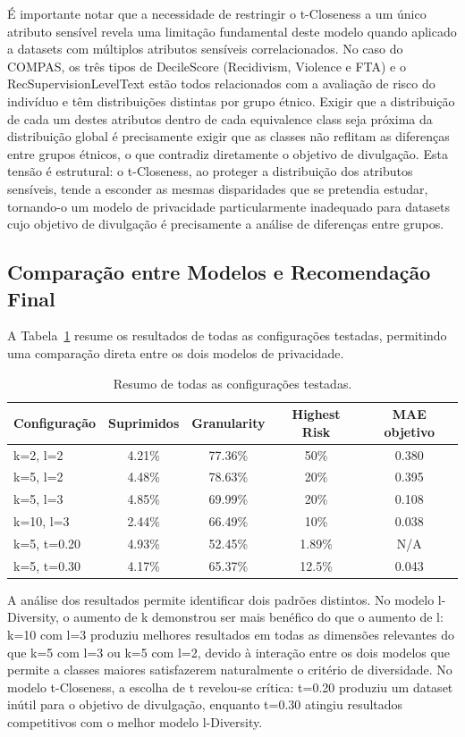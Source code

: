 É importante notar que a necessidade de restringir o t-Closeness a um único atributo sensível revela uma limitação fundamental deste modelo quando aplicado a datasets com múltiplos atributos sensíveis correlacionados. No caso do COMPAS, os três tipos de DecileScore (Recidivism, Violence e FTA) e o RecSupervisionLevelText estão todos relacionados com a avaliação de risco do indivíduo e têm distribuições distintas por grupo étnico. Exigir que a distribuição de cada um destes atributos dentro de cada equivalence class seja próxima da distribuição global é precisamente exigir que as classes não reflitam as diferenças entre grupos étnicos, o que contradiz diretamente o objetivo de divulgação. Esta tensão é estrutural: o t-Closeness, ao proteger a distribuição dos atributos sensíveis, tende a esconder as mesmas disparidades que se pretendia estudar, tornando-o um modelo de privacidade particularmente inadequado para datasets cujo objetivo de divulgação é precisamente a análise de diferenças entre grupos.

\subsection{Comparação entre Modelos e Recomendação Final}
\label{sec:comparacao}

A Tabela~\ref{tab:resumo} resume os resultados de todas as configurações testadas, permitindo uma comparação direta entre os dois modelos de privacidade.

\begin{table}[H]
\centering
\caption{Resumo de todas as configurações testadas.}
\label{tab:resumo}
\begin{tabular}{lcccc}
\toprule
\textbf{Configuração} & \textbf{Suprimidos} & \textbf{Granularity} & \textbf{Highest Risk} & \textbf{MAE objetivo} \\
\midrule
k=2, l=2 & 4.21\% & 77.36\% & 50\% & 0.380 \\
k=5, l=2 & 4.48\% & 78.63\% & 20\% & 0.395 \\
k=5, l=3 & 4.85\% & 69.99\% & 20\% & 0.108 \\
k=10, l=3 & 2.44\% & 66.49\% & 10\% & 0.038 \\
k=5, t=0.20 & 4.93\% & 52.45\% & 1.89\% & N/A \\
k=5, t=0.30 & 4.17\% & 65.37\% & 12.5\% & 0.043 \\
\bottomrule
\end{tabular}
\end{table}

A análise dos resultados permite identificar dois padrões distintos. No modelo l-Diversity, o aumento de k demonstrou ser mais benéfico do que o aumento de l: k=10 com l=3 produziu melhores resultados em todas as dimensões relevantes do que k=5 com l=3 ou k=5 com l=2, devido à interação entre os dois modelos que permite a classes maiores satisfazerem naturalmente o critério de diversidade. No modelo t-Closeness, a escolha de t revelou-se crítica: t=0.20 produziu um dataset inútil para o objetivo de divulgação, enquanto t=0.30 atingiu resultados competitivos com o melhor modelo l-Diversity.

